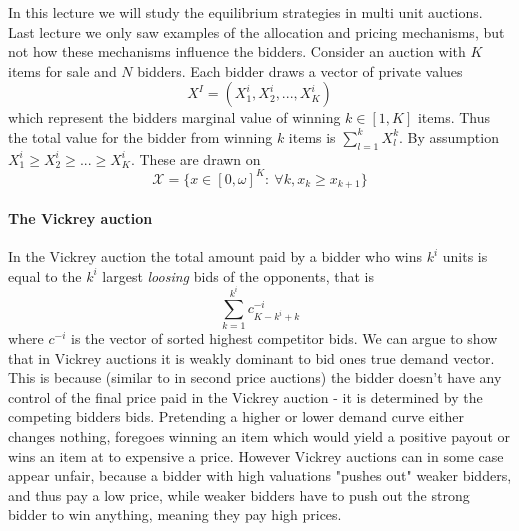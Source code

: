 In this lecture we will study the equilibrium strategies in multi unit auctions. Last lecture we only saw examples of the allocation and pricing mechanisms, but not how these mechanisms influence the bidders. Consider an auction with $K$ items for sale and $N$ bidders. Each bidder draws a vector of private values 
\begin{equation}
    X^I = (X_1^i, X_2^i, ..., X_K^i)
\end{equation}
which represent the bidders marginal value of winning $k\in[1,K]$ items. Thus the total value for the bidder from winning $k$ items is $\sum_{l=1}^k X_l^k$. By assumption $X_1^i \geq X_2^i \geq ... \geq X_K^i$. These are drawn on 
\begin{equation}
    \mathcal{X} = \{x\in[0, \omega]^K: \ \forall k, x_k \geq x_{k+1} \}
\end{equation}

\paragraph{The Vickrey auction}
In the Vickrey auction the total amount paid by a bidder who wins $k^i$ units is equal to the $k^i$ largest \textit{loosing} bids of the opponents, that is 
\begin{equation}
    \sum_{k=1}^{k^i} c_{K-k^i + k}^{-i}
\end{equation}
where $c^{-i}$ is the vector of sorted highest competitor bids. We can argue to show that in Vickrey auctions it is weakly dominant to bid ones true demand vector. This is because (similar to in second price auctions) the bidder doesn't have any control of the final price paid in the Vickrey auction - it is determined by the competing bidders bids. Pretending a higher or lower demand curve either changes nothing, foregoes winning an item which would yield a positive payout or wins an item at to expensive a price. However Vickrey auctions can in some case appear unfair, because a bidder with high valuations "pushes out" weaker bidders, and thus pay a low price, while weaker bidders have to push out the strong bidder to win anything, meaning they pay high prices. 

